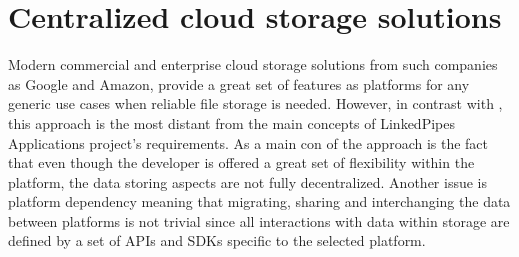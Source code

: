 \section{Centralized cloud storage solutions}

Modern commercial and enterprise cloud storage solutions from such companies as Google and Amazon, provide a great set of features as platforms for any generic use cases when reliable file storage is needed. However, in contrast with \solid{}, this approach is the most distant from the main concepts of LinkedPipes Applications project’s requirements. As a main con of the approach is the fact that even though the developer is offered a great set of flexibility within the platform, the data storing aspects are not fully decentralized. Another issue is platform dependency meaning that migrating, sharing and interchanging the data between platforms is not trivial since all interactions with data within storage are defined by a set of APIs and SDKs specific to the selected platform. 